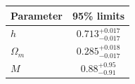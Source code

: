 \begin{tabular} { l  c}

 Parameter &  95\% limits\\
\hline
{\boldmath$h              $} & $0.713^{+0.017}_{-0.017}   $\\

{\boldmath$Ω_m            $} & $0.285^{+0.018}_{-0.017}   $\\

{\boldmath$M              $} & $0.88^{+0.95}_{-0.91}      $\\
\hline
\end{tabular}